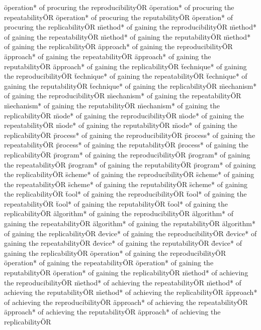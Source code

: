 \documentclass[
10pt, %
a4paper, %
oneside, %
headinclude,footinclude, %
BCOR5mm, %
]{scrartcl}
\begin{document}
\"operation* of procuring the reproducibility\" OR \"operation* of procuring the repeatability\" OR \"operation* of procuring the reputability\" OR \"operation* of procuring the replicability\" OR 
\"method* of gaining the reproducibility\" OR \"method* of gaining the repeatability\" OR \"method* of gaining the reputability\" OR \"method* of gaining the replicability\" OR 
\"approach* of gaining the reproducibility\" OR \"approach* of gaining the repeatability\" OR \"approach* of gaining the reputability\" OR \"approach* of gaining the replicability\" OR 
\"technique* of gaining the reproducibility\" OR \"technique* of gaining the repeatability\" OR \"technique* of gaining the reputability\" OR \"technique* of gaining the replicability\" OR 
\"mechanism* of gaining the reproducibility\" OR \"mechanism* of gaining the repeatability\" OR \"mechanism* of gaining the reputability\" OR \"mechanism* of gaining the replicability\" OR 
\"mode* of gaining the reproducibility\" OR \"mode* of gaining the repeatability\" OR \"mode* of gaining the reputability\" OR \"mode* of gaining the replicability\" OR 
\"process* of gaining the reproducibility\" OR \"process* of gaining the repeatability\" OR \"process* of gaining the reputability\" OR \"process* of gaining the replicability\" OR 
\"program* of gaining the reproducibility\" OR \"program* of gaining the repeatability\" OR \"program* of gaining the reputability\" OR \"program* of gaining the replicability\" OR 
\"scheme* of gaining the reproducibility\" OR \"scheme* of gaining the repeatability\" OR \"scheme* of gaining the reputability\" OR \"scheme* of gaining the replicability\" OR 
\"tool* of gaining the reproducibility\" OR \"tool* of gaining the repeatability\" OR \"tool* of gaining the reputability\" OR \"tool* of gaining the replicability\" OR 
\"algorithm* of gaining the reproducibility\" OR \"algorithm* of gaining the repeatability\" OR \"algorithm* of gaining the reputability\" OR \"algorithm* of gaining the replicability\" OR 
\"device* of gaining the reproducibility\" OR \"device* of gaining the repeatability\" OR \"device* of gaining the reputability\" OR \"device* of gaining the replicability\" OR 
\"operation* of gaining the reproducibility\" OR \"operation* of gaining the repeatability\" OR \"operation* of gaining the reputability\" OR \"operation* of gaining the replicability\" OR 
\"method* of achieving the reproducibility\" OR \"method* of achieving the repeatability\" OR \"method* of achieving the reputability\" OR \"method* of achieving the replicability\" OR 
\"approach* of achieving the reproducibility\" OR \"approach* of achieving the repeatability\" OR \"approach* of achieving the reputability\" OR \"approach* of achieving the replicability\" OR 
\end{document}
